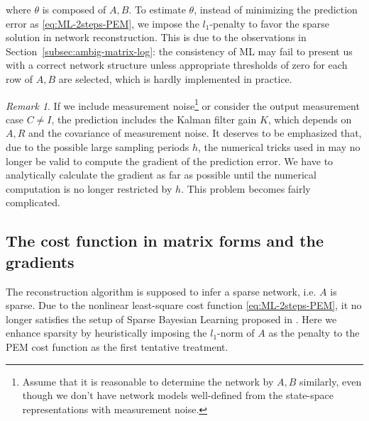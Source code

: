 \documentclass[letterpaper,10pt,journal,final]{IEEEtran}
\theoremstyle{definition}
\theoremstyle{remark}
\newtheorem{remark}{Remark}
\begin{document}
where $\theta$ is composed of $A,B$.
To estimate $\theta$, instead of minimizing the prediction error as
\eqref{eq:ML-2steps-PEM}, we impose the $l_1$-penalty to favor the sparse
solution in network reconstruction. This is due to the observations in
Section~\ref{subsec:ambig-matrix-log}: the consistency of ML may fail to present
us with a correct network structure unless appropriate thresholds of zero for
each row of $A, B$ are selected, which is hardly implemented in practice.

\begin{remark}
  \label{rmk:challenge-from-measurement-noise}
  If we include measurement noise\footnote{Assume that it is reasonable to
    determine the network by $A, B$ similarly, even though we don't have network
    models well-defined from the state-space representations with measurement
    noise.}  or consider the output measurement case $C\neq I$, the prediction
  includes the Kalman filter gain $K$, which depends on $A, R$ and the
  covariance of measurement noise.  It deserves to be emphasized that, due to
  the possible large sampling periods $h$, the numerical tricks used in
  \cite{Astrom1980,Ljung2010} may no longer be valid to compute the gradient of
  the prediction error. We have to analytically calculate the gradient as far as
  possible until the numerical computation is no longer restricted by $h$. This
  problem becomes fairly complicated.
\end{remark}



\subsection{The cost function in matrix forms and the gradients}
\label{sec:pred-errors-mat-gradient}

The reconstruction algorithm is supposed to infer a sparse network, i.e. $A$ is
sparse.  Due to the nonlinear least-square cost function \eqref{eq:ML-2steps-PEM}, it
no longer satisfies the setup of Sparse Bayesian Learning proposed in
\cite{Tipping2001}. Here we enhance sparsity by heuristically imposing the $l_1$-norm
of $A$ as the penalty to the PEM cost function as the first tentative treatment.
\end{document}
